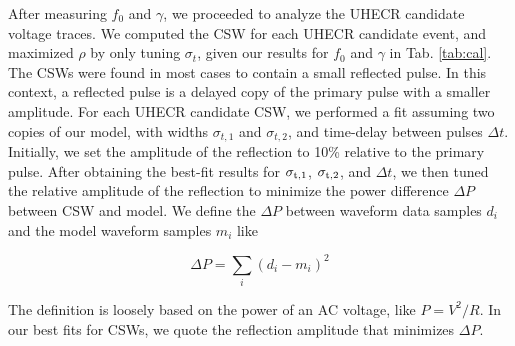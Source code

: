 \documentclass[amsmath,amssymb,aps,prd,10pt,twocolumn,showkeys]{revtex4}
\begin{document}
After measuring $f_0$ and $\gamma$, we proceeded to analyze the UHECR candidate voltage traces.  We computed the CSW for each UHECR candidate event, and maximized $\rho$ by only tuning $\sigma_t$, given our results for $f_0$ and $\gamma$ in Tab. \ref{tab:cal}.  The CSWs were found in most cases to contain a small reflected pulse.  In this context, a reflected pulse is a delayed copy of the primary pulse with a smaller amplitude.  For each UHECR candidate CSW, we performed a fit assuming two copies of our model, with widths $\sigma_{t,1}$ and $\sigma_{t,2}$, and time-delay between pulses $\Delta t$.  Initially, we set the amplitude of the reflection to 10\% relative to the primary pulse.  After obtaining the best-fit results for $\sigma_{\rm t,1}$, $\sigma_{\rm t,2}$, and $\Delta t$, we then tuned the relative amplitude of the reflection to minimize the power difference $\Delta P$ between CSW and model.  We define the $\Delta P$ between waveform data samples $d_i$ and the model waveform samples $m_i$ like

\begin{equation}
\Delta P = \sum_i (d_i - m_i)^2
\end{equation}

\noindent
The definition is loosely based on the power of an AC voltage, like $P = V^2/R$.  In our best fits for CSWs, we quote the reflection amplitude that minimizes $\Delta P$.
\end{document}
